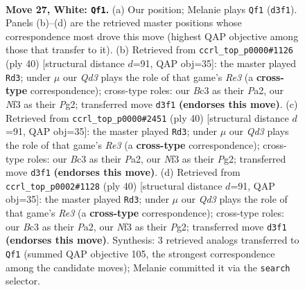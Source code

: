 \documentclass[11pt]{article}
\begin{document}
\clearpage

\begin{figure}[p]\centering
\begin{subfigure}{0.46\textwidth}\centering
\resizebox{\linewidth}{!}{%
\newchessgame
\chessboard[
  setfen={rk3b2/pp4pr/2p1b2p/Pq1p1p2/3P3P/2BQPN2/1PK2PP1/1R4R1 w - - 5 27},
  showmover=false,
  pgfstyle=straightmove, color=movearrow, markmove={d3-f1}
]}
\caption{}
\end{subfigure}\hfill
\begin{subfigure}{0.46\textwidth}\centering
\resizebox{\linewidth}{!}{%
\newchessgame
\chessboard[
  setfen={1k3b1r/1prb1p2/pq1ppp2/5P1p/4P2P/2N1RB2/PPPQ2P1/1K1R4 w - - 9 21},
  showmover=false,
  pgfstyle=straightmove, color=movearrow, markmove={e3-d3}
]}
\caption{}
\end{subfigure}
\\[4pt]
\begin{subfigure}{0.46\textwidth}\centering
\resizebox{\linewidth}{!}{%
\newchessgame
\chessboard[
  setfen={1k3b1r/1prb1p2/pq1ppp2/5P1p/4P2P/2N1RB2/PPPQ2P1/1K1R4 w - - 9 21},
  showmover=false,
  pgfstyle=straightmove, color=movearrow, markmove={e3-d3}
]}
\caption{}
\end{subfigure}\hfill
\begin{subfigure}{0.46\textwidth}\centering
\resizebox{\linewidth}{!}{%
\newchessgame
\chessboard[
  setfen={1k3b1r/1prb1p2/pq1ppp2/5P1p/4P2P/2N1RB2/PPPQ2P1/1K1R4 w - - 7 21},
  showmover=false,
  pgfstyle=straightmove, color=movearrow, markmove={e3-d3}
]}
\caption{}
\end{subfigure}
\caption{\textbf{Move 27, White: \texttt{Qf1}.} (a) Our position; Melanie plays \texttt{Qf1} (\texttt{d3f1}). Panels (b)--(d) are the retrieved master positions whose correspondence most drove this move (highest QAP objective among those that transfer to it). (b) Retrieved from \texttt{ccrl\_top\_p0000\#1126} (ply 40) [structural distance $d$=91, QAP obj=35]: the master played \texttt{Rd3}; under $\mu$ our \emph{Qd3} plays the role of that game's \emph{Re3} (a \textbf{cross-type} correspondence); cross-type roles: our \emph{B}c3 as their \emph{P}a2, our \emph{N}f3 as their \emph{P}g2; transferred move \texttt{d3f1} \textbf{(endorses this move)}. (c) Retrieved from \texttt{ccrl\_top\_p0000\#2451} (ply 40) [structural distance $d$=91, QAP obj=35]: the master played \texttt{Rd3}; under $\mu$ our \emph{Qd3} plays the role of that game's \emph{Re3} (a \textbf{cross-type} correspondence); cross-type roles: our \emph{B}c3 as their \emph{P}a2, our \emph{N}f3 as their \emph{P}g2; transferred move \texttt{d3f1} \textbf{(endorses this move)}. (d) Retrieved from \texttt{ccrl\_top\_p0002\#1128} (ply 40) [structural distance $d$=91, QAP obj=35]: the master played \texttt{Rd3}; under $\mu$ our \emph{Qd3} plays the role of that game's \emph{Re3} (a \textbf{cross-type} correspondence); cross-type roles: our \emph{B}c3 as their \emph{P}a2, our \emph{N}f3 as their \emph{P}g2; transferred move \texttt{d3f1} \textbf{(endorses this move)}. Synthesis: 3 retrieved analogs transferred to \texttt{Qf1} (summed QAP objective 105, the strongest correspondence among the candidate moves); Melanie committed it via the \texttt{search} selector.}
\label{fig:thought-m52}
\end{figure}
\end{document}
